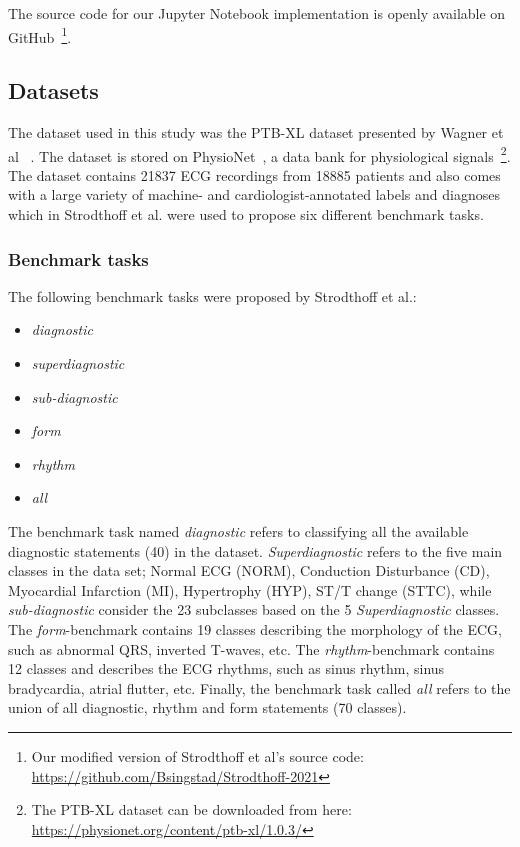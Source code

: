 The source code for our Jupyter Notebook implementation is openly available on GitHub~\footnote{Our modified version of Strodthoff et al's source code: \url{https://github.com/Bsingstad/Strodthoff-2021}}.



\subsection{Datasets}

The dataset used in this study was the PTB-XL dataset presented by Wagner et al ~\cite{wagner_et_al_ptb-xl_2020}. The dataset is stored on PhysioNet~\cite{wagner_ptb-xl_nodate,goldberger_physiobank_2000}, a data bank for physiological signals~\footnote{The PTB-XL dataset can be downloaded from here: \url{https://physionet.org/content/ptb-xl/1.0.3/}}. The dataset contains 21837 ECG recordings from 18885 patients and also comes with a large variety of machine- and cardiologist-annotated labels and diagnoses which in Strodthoff et al. were used to propose six different benchmark tasks. 

\subsubsection{Benchmark tasks}
The following benchmark tasks were proposed by Strodthoff et al.:

\begin{itemize}[noitemsep,topsep=1pt]
    \item \textit{diagnostic}
    \item \textit{superdiagnostic}
    \item \textit{sub-diagnostic}
    \item \textit{form}
    \item \textit{rhythm}
    \item \textit{all}
\end{itemize}

The benchmark task named \textit{diagnostic} refers to classifying all the available diagnostic statements (40) in the dataset. \textit{Superdiagnostic} refers to the five main classes in the data set; Normal ECG (NORM), Conduction Disturbance (CD), Myocardial Infarction (MI), Hypertrophy (HYP), ST/T change (STTC), while \textit{sub-diagnostic} consider the 23 subclasses based on the 5 \textit{Superdiagnostic} classes. The \textit{form}-benchmark contains 19 classes describing the morphology of the ECG, such as abnormal QRS, inverted T-waves, etc. The \textit{rhythm}-benchmark contains 12 classes and describes the ECG rhythms, such as sinus rhythm, sinus bradycardia, atrial flutter, etc. Finally, the benchmark task called \textit{all} refers to the union of all diagnostic, rhythm and form statements (70 classes).

